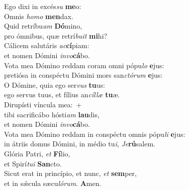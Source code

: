 \evenverse Ego dixi in excés\textit{su} \textbf{me}o:~\*\\
\evenverse Omnis \textit{ho}\textit{mo} \textbf{men}dax.\\
\oddverse Quid retríbu\textit{am} \textbf{Dó}mino,~\*\\
\oddverse pro ómnibus, quæ retrí\textit{bu}\textit{it} \textbf{mi}hi?\\
\evenverse Cálicem salutáris \textit{ac}\textbf{cí}piam:~\*\\
\evenverse et nomen Dómini \textit{in}\textit{vo}\textbf{cá}bo.\\
\oddverse Vota mea Dómino reddam coram omni pópu\textit{lo} \textbf{e}jus:~\*\\
\oddverse pretiósa in conspéctu Dómini mors san\textit{ctó}\textit{rum} \textbf{e}jus:\\
\evenverse O Dómine, quia ego ser\textit{vus} \textbf{tu}us:~\*\\
\evenverse ego servus tuus, et fílius an\textit{cíl}\textit{læ} \textbf{tu}æ.\\
\oddverse Dirupísti víncula mea:~+\\
\oddverse  tibi sacrificábo hósti\textit{am} \textbf{lau}dis,~\*\\
\oddverse et nomen Dómini \textit{in}\textit{vo}\textbf{cá}bo.\\
\evenverse Vota mea Dómino reddam in conspéctu omnis pópu\textit{li} \textbf{e}jus:~\*\\
\evenverse in átriis domus Dómini, in médio tu\textit{i}, \textit{Je}\textbf{rú}salem.\\
\oddverse Glória Patri, \textit{et} \textbf{Fí}lio,~\*\\
\oddverse et Spirí\textit{tu}\textit{i} \textbf{San}cto.\\
\evenverse Sicut erat in princípio, et nunc, \textit{et} \textbf{sem}per,~\*\\
\evenverse et in sǽcula sæcu\textit{ló}\textit{rum}. \textbf{A}men.\\
